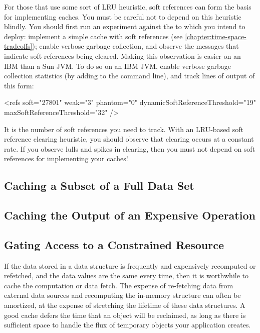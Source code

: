 For those \jres that use some sort of LRU heuristic, soft references can form the
basis for implementing caches. You must be careful not to depend on this
heuristic blindly. You should first run an experiment against the \jre to which
you intend to deploy: implement a simple cache with soft references (see
\autoref{chapter:time-space-tradeoffs}); enable verbose garbage collection, and
observe the messages that indicate soft references being cleared. Making this
observation is easier on an IBM than a Sun JVM. To do so on an IBM JVM, enable
verbose garbage collection statistics (by adding  to the
command line), and track lines of output of this form:
\begin{shortlisting}
<refs soft="27801" weak="3" phantom="0" dynamicSoftReferenceThreshold="19" maxSoftReferenceThreshold="32" />
\end{shortlisting}
It is the number of soft references you need to track. With an
LRU-based soft reference clearing heuristic, you should observe that clearing
occurs at a constant rate. If you observe lulls and spikes in clearing, then you
must not depend on soft references for implementing your caches!




\subsection{Caching a Subset of a Full Data Set}

\subsection{Caching the Output of an Expensive Operation}

\subsection{Gating Access to a Constrained Resource}

If the data stored in a data structure is frequently and expensively recomputed
or refetched, and the data values are the same every time, then it is worthwhile
to cache the computation or data fetch. The expense of re-fetching data from
external data sources and recomputing the in-memory structure can often be
amortized, at the expense of stretching the lifetime of these data structures. A
good cache defers the time that an object will be reclaimed, as long as there is
sufficient space to handle the flux of temporary objects your application
creates.

